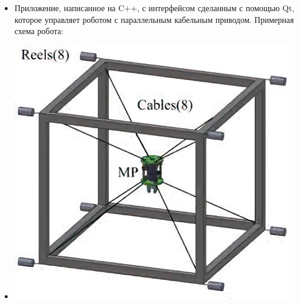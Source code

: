 \documentclass[10pt,a4paper,ragged2e]{altacv}
\begin{document}
\begin{itemize}
\item Приложение, написанное на C++, с интерфейсом сделанным с помощью Qt, которое управляет роботом с параллельным кабельным приводом. Примерная схема робота:
\item \includegraphics[scale=0.3]{Cube.jpg} 
\end{itemize}
\smallskip

\smallskip
{}
\smallskip
{}
\smallskip




\end{document}
